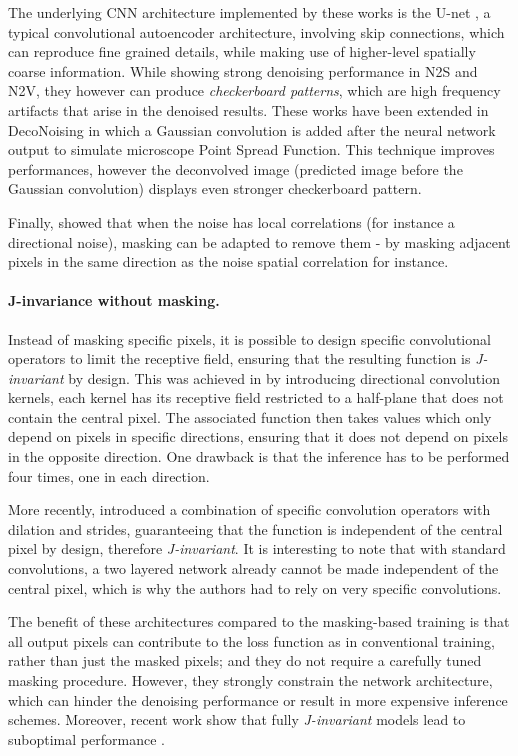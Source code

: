 \documentclass{article}
\begin{document}
The underlying CNN architecture implemented by these works is the U-net \cite{ronneberger2015u}, a typical convolutional autoencoder architecture, involving skip connections, which can reproduce fine grained details, while making use of higher-level spatially coarse information. While showing strong denoising performance in N2S and N2V, they however can produce \textit{checkerboard patterns}, which are high frequency artifacts that arise in the denoised results.
These works have been extended in DecoNoising \cite{goncharova2020} in which a Gaussian convolution is added after the neural network output to simulate microscope Point Spread Function.
This technique improves performances, however the deconvolved image (predicted image before the Gaussian convolution) displays even stronger checkerboard pattern.

Finally, \cite{broaddus2020removing} showed that when the noise has local correlations (for instance a  directional noise),  masking can be adapted to remove them - by masking adjacent pixels in the same direction as the noise spatial correlation for instance.

\paragraph{J-invariance without masking.}
Instead of masking specific pixels, it is possible to design specific convolutional operators to limit the receptive field, ensuring that the resulting function is \textit{J-invariant} by design. This was achieved in \cite{laine2019high} by introducing directional convolution kernels, each kernel has its receptive field restricted to a half-plane that does not contain the central pixel. The associated function then takes values which only depend on pixels in specific directions, ensuring that it does not depend on pixels in the opposite direction. One drawback is that the inference has to be performed four times, one in each direction.

More recently, \cite{lee2020noise2kernel} introduced a combination of specific convolution operators with dilation and strides, guaranteeing that the function is independent of the central pixel by design, therefore \textit{J-invariant}. It is interesting to note that with standard convolutions, a two layered network already cannot be made independent of the central pixel, which is why the authors had to rely on very specific convolutions.

The benefit of these architectures compared to the masking-based training is that all output pixels can contribute to the loss function as in conventional training, rather than just the masked pixels; and they do not require a carefully tuned masking procedure. However, they strongly constrain the network architecture, which can hinder the denoising performance or result in more expensive inference schemes. Moreover, recent work show that fully \textit{J-invariant} models lead to suboptimal performance \cite{xie2020noise2same}.
\end{document}
